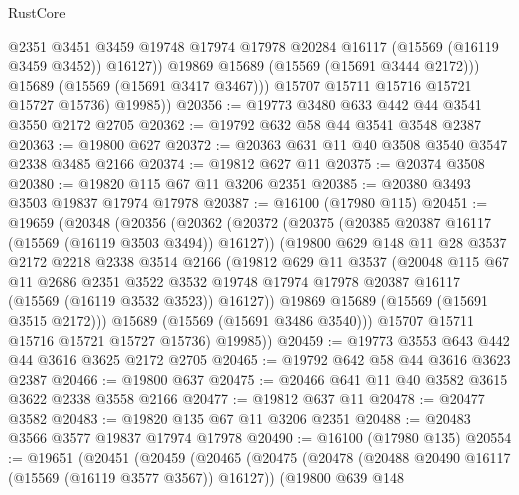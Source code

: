 \begin{lexlean}{RustCore}
\begin{coremodule}
                  @2351
                  @3451
                  @3459
                  @19748
                  @17974
                  @17978
                  @20284
                  @16117
                  (@15569 (@16119 @3459 @3452))
                  @16127))
              @19869
              @15689
              (@15569 (@15691 @3444 @2172)))
            @15689
            (@15569 (@15691 @3417 @3467)))
          @15707
          @15711
          @15716
          @15721
          @15727
          @15736)
        @19985))
@20356 := @19773 @3480 @633 @442 @44 @3541 @3550 @2172 @2705
@20362 := @19792 @632 @58 @44 @3541 @3548 @2387
@20363 := @19800 @627
@20372 := @20363 @631 @11 @40 @3508 @3540 @3547 @2338 @3485 @2166
@20374 := @19812 @627 @11
@20375 := @20374 @3508
@20380 := @19820 @115 @67 @11 @3206 @2351
@20385 := @20380 @3493 @3503 @19837 @17974 @17978
@20387 := @16100 (@17980 @115)
@20451 := @19659
    (@20348
      (@20356
        (@20362
          (@20372
            (@20375 (@20385 @20387 @16117 (@15569 (@16119 @3503 @3494)) @16127))
            (@19800
              @629
              @148
              @11
              @28
              @3537
              @2172
              @2218
              @2338
              @3514
              @2166
              (@19812
                @629
                @11
                @3537
                (@20048
                  @115
                  @67
                  @11
                  @2686
                  @2351
                  @3522
                  @3532
                  @19748
                  @17974
                  @17978
                  @20387
                  @16117
                  (@15569 (@16119 @3532 @3523))
                  @16127))
              @19869
              @15689
              (@15569 (@15691 @3515 @2172)))
            @15689
            (@15569 (@15691 @3486 @3540)))
          @15707
          @15711
          @15716
          @15721
          @15727
          @15736)
        @19985))
@20459 := @19773 @3553 @643 @442 @44 @3616 @3625 @2172 @2705
@20465 := @19792 @642 @58 @44 @3616 @3623 @2387
@20466 := @19800 @637
@20475 := @20466 @641 @11 @40 @3582 @3615 @3622 @2338 @3558 @2166
@20477 := @19812 @637 @11
@20478 := @20477 @3582
@20483 := @19820 @135 @67 @11 @3206 @2351
@20488 := @20483 @3566 @3577 @19837 @17974 @17978
@20490 := @16100 (@17980 @135)
@20554 := @19651
    (@20451
      (@20459
        (@20465
          (@20475
            (@20478 (@20488 @20490 @16117 (@15569 (@16119 @3577 @3567)) @16127))
            (@19800
              @639
              @148

\end{coremodule}
\end{lexlean}
